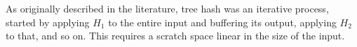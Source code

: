 \documentclass[sigconf, nonacm]{acmart}
\begin{document}







As originally described in the literature, tree hash was an iterative process, started by applying $H_1$ to the entire input and buffering its output, applying $H_2$ to that, and so on.
This requires a scratch space linear in the size of the input.
\end{document}
